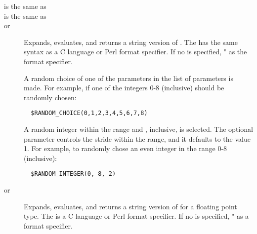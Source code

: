 \begin{description}
\item [ is the same as ]

\item [ is the same as ]

\item [
       or ]
Expands, evaluates, and returns a string version of 
.
The  has the same syntax as
a C language or Perl format specifier.
If no  is specified, \verb@"%d"@ is used
as the format specifier.

\item []
A random choice of one of the parameters in the list of parameters is made.
For example,
if one of the integers 0-8 (inclusive) should be randomly
chosen:
\begin{verbatim}
  $RANDOM_CHOICE(0,1,2,3,4,5,6,7,8)
\end{verbatim}

\item []
A random integer within the range \verb@min@ and \verb@max@, inclusive,
is selected.
The optional \verb@step@ parameter
controls the stride within the range, and it defaults to the value 1.
For example, to randomly chose an even integer in the range 0-8 (inclusive):
\begin{verbatim}
  $RANDOM_INTEGER(0, 8, 2)
\end{verbatim}

\item [
       or ]
Expands, evaluates, and returns a string version of 
 for a floating point type.
The  is a C language or Perl format specifier.
If no  is specified, \verb@"%16G"@ is used
as a format specifier.


\end{description}
